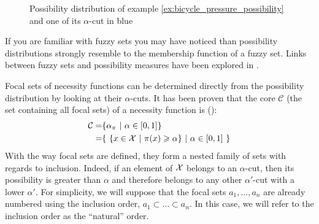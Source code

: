 \begin{figure}[!ht]
    \centering
    \caption{Possibility distribution of example \ref{ex:bicycle_pressure_possibility} and one of its $\alpha$-cut in blue}
    \label{fig:possibility_distribution}
\end{figure}

\begin{remark}
    If you are familiar with fuzzy sets you may have noticed than possibility distributions strongly resemble to the membership function of a fuzzy set. Links between fuzzy sets and possibility measures have been explored in \cite{zadeh_fuzzy_1999}.
\end{remark}

Focal sets of necessity functions can be determined directly from the possibility distribution by looking at their \( \alpha \)-cuts. It has been proven that the core $\mathcal{C}$ (the set containing all focal sets) of a necessity function is (\cite{destercke_unifying_2008}):
\begin{align*}
    \mathcal{C} =& \{\alpha_\pi~|~\alpha\in[0,1]\}\\
    =& \{ ~\{x\in{\mathcal{X}}~|~\pi(x)\geqslant\alpha\}~|~\alpha\in[0,1]~\}
\end{align*}
With the way focal sets are defined, they form a nested family of sets with regards to inclusion. Indeed, if an element of \({\mathcal{X}}\) belongs to an \(\alpha\)-cut, then its possibility is greater than \(\alpha\) and therefore belongs to any other \(\alpha'\)-cut with a lower \(\alpha'\). For simplicity, we will suppose that the focal sets \(a_1,\dots,a_n\) are already numbered using the inclusion order, \ie \( a_1\subset\dots\subset a_n\). In this case, we will refer to the inclusion order as the ``natural'' order.

